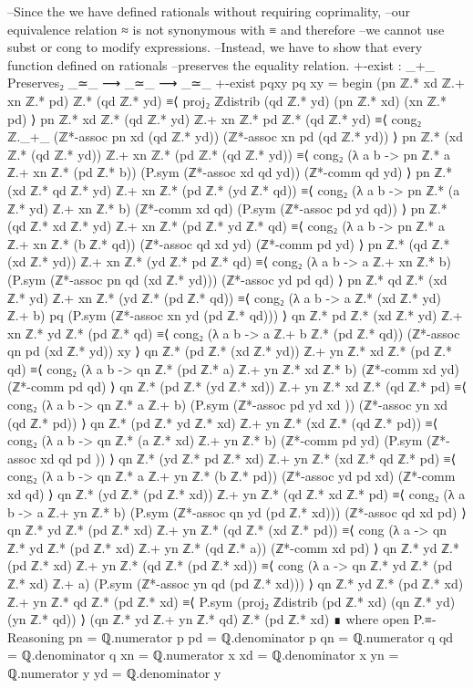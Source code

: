 \documentclass[11pt,a4paper]{article}
\begin{document}
\begin{code}
--Since the we have defined rationals without requiring coprimality, 
--our equivalence relation ≈ is not synonymous with ≡ and therefore 
--we cannot use subst or cong to modify expressions. 
--Instead, we have to show that every function defined on rationals 
--preserves the equality relation.
+-exist :  _+_ Preserves₂ _≃_ ⟶ _≃_ ⟶ _≃_
+-exist {p}{q}{x}{y} pq xy =  begin 
  (pn ℤ.* xd ℤ.+ xn ℤ.* pd) ℤ.* (qd ℤ.* yd) 
  ≡⟨ proj₂ ℤdistrib (qd ℤ.* yd) (pn ℤ.* xd) (xn ℤ.* pd)   ⟩
  pn ℤ.* xd ℤ.* (qd ℤ.* yd) ℤ.+ xn ℤ.* pd ℤ.* (qd ℤ.* yd) 
  ≡⟨ cong₂ ℤ._+_ (ℤ*-assoc pn xd (qd ℤ.* yd)) (ℤ*-assoc xn pd (qd ℤ.* yd)) ⟩
  pn ℤ.* (xd ℤ.* (qd ℤ.* yd)) ℤ.+ xn ℤ.* (pd ℤ.* (qd ℤ.* yd)) 
  ≡⟨ cong₂ (λ a b -> pn ℤ.* a ℤ.+ xn ℤ.* (pd ℤ.* b)) 
    (P.sym (ℤ*-assoc xd qd yd)) (ℤ*-comm qd yd) ⟩
  pn ℤ.* (xd ℤ.* qd ℤ.* yd) ℤ.+ xn ℤ.* (pd ℤ.* (yd ℤ.* qd)) 
  ≡⟨ cong₂ (λ a b -> pn ℤ.* (a ℤ.* yd) ℤ.+ xn ℤ.* b) 
    (ℤ*-comm xd qd) (P.sym (ℤ*-assoc pd yd qd)) ⟩
  pn ℤ.* (qd ℤ.* xd ℤ.* yd) ℤ.+ xn ℤ.* (pd ℤ.* yd ℤ.* qd) 
  ≡⟨ cong₂ (λ a b -> pn ℤ.* a ℤ.+ xn ℤ.* (b ℤ.* qd)) 
    (ℤ*-assoc qd xd yd) (ℤ*-comm pd yd) ⟩
  pn ℤ.* (qd ℤ.* (xd ℤ.* yd)) ℤ.+ xn ℤ.* (yd ℤ.* pd ℤ.* qd) 
  ≡⟨ cong₂ (λ a b -> a ℤ.+ xn ℤ.* b) 
    (P.sym (ℤ*-assoc pn qd (xd ℤ.* yd))) (ℤ*-assoc yd pd qd) ⟩
  pn ℤ.* qd ℤ.* (xd ℤ.* yd) ℤ.+ xn ℤ.* (yd ℤ.* (pd ℤ.* qd)) 
  ≡⟨ cong₂ (λ a b -> a ℤ.* (xd ℤ.* yd) ℤ.+ b) pq  
    (P.sym (ℤ*-assoc xn yd (pd ℤ.* qd))) ⟩
  qn ℤ.* pd ℤ.* (xd ℤ.* yd) ℤ.+ xn ℤ.* yd ℤ.* (pd ℤ.* qd) 
  ≡⟨ cong₂ (λ a b -> a ℤ.+ b ℤ.* (pd ℤ.* qd)) 
    (ℤ*-assoc qn pd (xd ℤ.* yd)) xy ⟩
  qn ℤ.* (pd ℤ.* (xd ℤ.* yd)) ℤ.+ yn ℤ.* xd ℤ.* (pd ℤ.* qd) 
  ≡⟨ cong₂ (λ a b -> qn ℤ.* (pd ℤ.* a) ℤ.+ yn ℤ.* xd ℤ.* b) 
    (ℤ*-comm xd yd) (ℤ*-comm pd qd) ⟩
  qn ℤ.* (pd ℤ.* (yd ℤ.* xd)) ℤ.+ yn ℤ.* xd ℤ.* (qd ℤ.* pd) 
  ≡⟨ cong₂ (λ a b -> qn ℤ.* a ℤ.+ b) 
    (P.sym (ℤ*-assoc pd yd xd )) (ℤ*-assoc yn xd (qd ℤ.* pd)) ⟩
  qn ℤ.* (pd ℤ.* yd ℤ.* xd) ℤ.+ yn ℤ.* (xd ℤ.* (qd ℤ.* pd)) 
  ≡⟨ cong₂ (λ a b -> qn ℤ.* (a ℤ.* xd) ℤ.+ yn ℤ.* b) 
    (ℤ*-comm pd yd) (P.sym (ℤ*-assoc xd qd pd )) ⟩
  qn ℤ.* (yd ℤ.* pd ℤ.* xd) ℤ.+ yn ℤ.* (xd ℤ.* qd ℤ.* pd) 
  ≡⟨ cong₂ (λ a b -> qn ℤ.* a ℤ.+ yn ℤ.* (b ℤ.* pd)) 
    (ℤ*-assoc yd pd xd) (ℤ*-comm xd qd) ⟩
  qn ℤ.* (yd ℤ.* (pd ℤ.* xd)) ℤ.+ yn ℤ.* (qd ℤ.* xd ℤ.* pd) 
  ≡⟨ cong₂ (λ a b -> a ℤ.+ yn ℤ.* b) 
    (P.sym (ℤ*-assoc qn yd (pd ℤ.* xd))) (ℤ*-assoc qd xd pd) ⟩
  qn ℤ.* yd ℤ.* (pd ℤ.* xd) ℤ.+ yn ℤ.* (qd ℤ.* (xd ℤ.* pd)) 
  ≡⟨ cong (λ a -> qn ℤ.* yd ℤ.* (pd ℤ.* xd) ℤ.+ yn ℤ.* (qd ℤ.* a)) 
    (ℤ*-comm xd pd) ⟩
  qn ℤ.* yd ℤ.* (pd ℤ.* xd) ℤ.+ yn ℤ.* (qd ℤ.* (pd ℤ.* xd)) 
  ≡⟨ cong (λ a -> qn ℤ.* yd ℤ.* (pd ℤ.* xd) ℤ.+ a) 
    (P.sym (ℤ*-assoc yn qd (pd ℤ.* xd))) ⟩
  qn ℤ.* yd ℤ.* (pd ℤ.* xd) ℤ.+ yn ℤ.* qd ℤ.* (pd ℤ.* xd) 
  ≡⟨ P.sym (proj₂ ℤdistrib (pd ℤ.* xd) (qn ℤ.* yd) (yn ℤ.* qd)) ⟩
  (qn ℤ.* yd ℤ.+ yn ℤ.* qd) ℤ.* (pd ℤ.* xd)
        ∎
         where
           open P.≡-Reasoning
           pn = ℚ.numerator p
           pd = ℚ.denominator p
           qn = ℚ.numerator q
           qd = ℚ.denominator q
           xn = ℚ.numerator x
           xd = ℚ.denominator x
           yn = ℚ.numerator y
           yd = ℚ.denominator y
\end{code}
\end{document}
